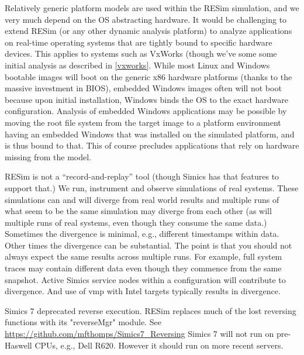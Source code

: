 \documentclass[titlepage]{article}
\begin{document}
Relatively generic platform models are used within the RESim simulation, and we very much depend on the OS abstracting hardware.  It would be challenging to extend  
RESim (or any other dynamic analysis platform) to analyze applications on real-time operating systems that are tightly bound to specific hardware devices. 
This applies to systems such as VxWorks (though we've some some initial analysis as described in \ref{vxworks}.  While most Linux and Windows bootable images will 
boot on the generic x86 hardware platforms (thanks to the massive investment in BIOS), embedded Windows images often will not boot because upon initial installation, Windows
binds the OS to the exact hardware configuration.  Analysis of embedded Windows applications may be possible by moving the root file system from the target image to a
platform environment having an embedded Windows that was installed on the simulated platform, and is thus bound to that.  This of course precludes applications that rely on
hardware missing from the model. 

RESim is not a ``record-and-replay'' tool (though Simics has that features to support that.)  We run, instrument and observe simulations of real systems.
These simulations can and will diverge from real world results and multiple runs of what seem to be the same simulation may diverge from each other (as will
multiple runs of real systems, even though they consume the same data.)  Sometimes the divergence is minimal, e.g., different timestamps within data.  Other times
the divergence can be substantial.  The point is that you should not always expect the same results across multiple runs.  For example, full system traces
may contain different data even though they commence from the same snapshot. Active Simics service nodes within a configuration will contribute to divergence. 
And use of vmp with Intel targets typically results in divergence.

Simics 7 deprecated reverse execution.  RESim replaces much of the lost reversing functions with its "reverseMgr" module.
See \url{https://github.com/mfthomps/Simics7\_Reversing}
Simics 7 will not run on pre-Haswell CPUs, e.g., Dell R620.  However it should run on more recent servers.
\end{document}
